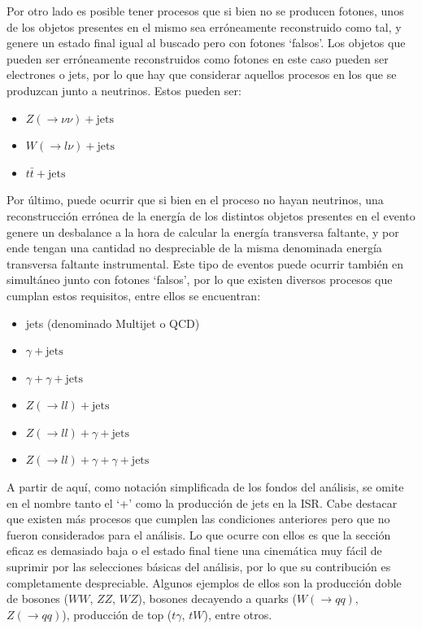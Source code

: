 Por otro lado es posible tener procesos que si bien no se producen fotones, unos de los objetos presentes en el mismo sea erróneamente reconstruido como tal, y genere un estado final igual al buscado pero con fotones `falsos'. Los objetos que pueden ser erróneamente reconstruidos como fotones en este caso pueden ser electrones o jets, por lo que hay que considerar aquellos procesos en los que se produzcan junto a neutrinos. Estos pueden ser:

\begin{itemize}
  \item $Z(\rightarrow \nu\nu) + \text{jets}$
  \item $W(\rightarrow l\nu) + \text{jets}$
  \item $t\bar{t} + \text{jets}$
\end{itemize}

Por último, puede ocurrir que si bien en el proceso no hayan neutrinos, una reconstrucción errónea de la energía de los distintos objetos presentes en el evento genere un desbalance a la hora de calcular la energía transversa faltante, y por ende tengan una cantidad no despreciable de la misma denominada energía transversa faltante instrumental. Este tipo de eventos puede ocurrir también en simultáneo junto con fotones `falsos', por lo que existen diversos procesos que cumplan estos requisitos, entre ellos se encuentran:

\begin{itemize}
  \item jets (denominado Multijet o QCD)
  \item $\gamma + \text{jets}$
  \item $\gamma + \gamma + \text{jets}$
  \item $Z(\rightarrow ll) + \text{jets}$
  \item $Z(\rightarrow ll) + \gamma + \text{jets}$
  \item $Z(\rightarrow ll) + \gamma + \gamma + \text{jets}$
\end{itemize}

A partir de aquí, como notación simplificada de los fondos del análisis, se omite en el nombre tanto el `+' como la producción de jets en la ISR. Cabe destacar que existen más procesos que cumplen las condiciones anteriores pero que no fueron considerados para el análisis. Lo que ocurre con ellos es que la sección eficaz es demasiado baja o el estado final tiene una cinemática muy fácil de suprimir por las selecciones básicas del análisis, por lo que su contribución es completamente despreciable. Algunos ejemplos de ellos son la producción doble de bosones  ($WW$, $ZZ$, $WZ$), bosones decayendo a quarks ($W(\rightarrow qq)$, $Z(\rightarrow qq)$), producción de top ($t\gamma$, $tW$), entre otros.

